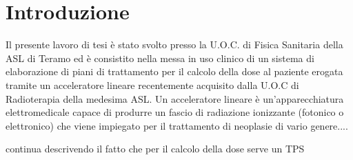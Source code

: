 \chapter*{Introduzione} 
Il presente lavoro di tesi è stato svolto presso la U.O.C. di Fisica Sanitaria della ASL di Teramo ed è consistito nella messa in uso clinico di un sistema di elaborazione di piani di trattamento per il calcolo della dose al paziente erogata tramite un acceleratore lineare recentemente acquisito dalla U.O.C di Radioterapia della medesima ASL. Un acceleratore lineare è un'apparecchiatura elettromedicale capace di produrre un fascio di radiazione ionizzante (fotonico o elettronico) che viene impiegato per il trattamento di neoplasie di vario genere....


continua descrivendo il fatto che per il calcolo della dose serve un TPS